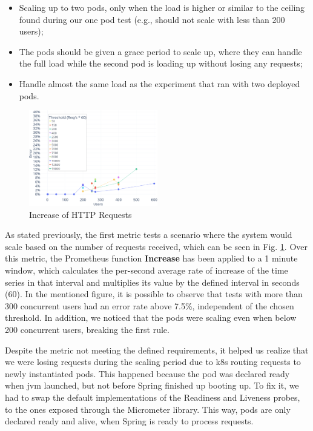 \begin{itemize}
    \item Scaling up to two pods, only when the load is higher or similar to the ceiling found during our one pod test (e.g., should not scale with less than 200 users);
    \item The pods should be given a grace period to scale up, where they can handle the full load while the second pod is loading up without losing any requests;
    \item Handle almost the same load as the experiment that ran with two deployed pods.
\end{itemize}

\begin{figure}[h]
    \centering
    \includegraphics[width=0.5\textwidth]{Chapters/img/testing/HPA_HttpCountIncreaseLeft.png}
    \caption{Increase of HTTP Requests}
    \label{fig:metric_increase}
\end{figure}

As stated previously, the first metric tests a scenario where the system would scale based on the number of requests received, which can be seen in Fig. \ref{fig:metric_increase}. Over this metric, the Prometheus function \textbf{Increase} has been applied to a 1 minute window, which calculates the per-second average rate of increase of the time series in that interval and multiplies its value by the defined interval in seconds (60). In the mentioned figure, it is possible to observe that tests with more than 300 concurrent users had an error rate above 7.5\%, independent of the chosen threshold. In addition, we noticed that the pods were scaling even when below 200 concurrent users, breaking the first rule.

Despite the metric not meeting the defined requirements, it helped us realize that we were losing requests during the scaling period due to \acrshort{k8s} routing requests to newly instantiated pods. This happened because the pod was declared ready when \acrshort{jvm} launched, but not before Spring finished up booting up. To fix it, we had to swap the default implementations of the Readiness and Liveness probes, to the ones exposed through the Micrometer library. This way, pods are only declared ready and alive, when Spring is ready to process requests.

